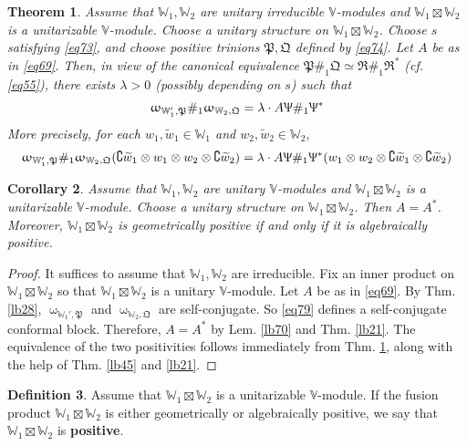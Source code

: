 \documentclass[11pt,b5paper,notitlepage]{article}
\theoremstyle{definition}
\newtheorem{df}{Definition}[section]
\theoremstyle{plain}
\newtheorem{thm}[df]{Theorem}
\newtheorem{co}[df]{Corollary}
\newcommand{\fk}{\mathfrak}
\newcommand{\wtd}{\widetilde}
\newcommand{\Co}{\complement}
\newcommand{\Vbb}{\mathbb V}
\newcommand{\Wbb}{\mathbb W}
\numberwithin{equation}{section}
\begin{document}
\begin{thm}\label{lb50}
Assume that $\Wbb_1,\Wbb_2$ are unitary irreducible $\Vbb$-modules and $\Wbb_1\boxtimes\Wbb_2$ is a unitarizable $\Vbb$-module. Choose a unitary structure on $\Wbb_1\boxtimes\Wbb_2$. Choose $s$ satisfying \eqref{eq73}, and choose positive trinions $\fk P,\fk Q$ defined by \eqref{eq74}. Let $A$ be as in \eqref{eq69}. Then, in view of the canonical equivalence $\fk P\#_1\fk Q\simeq\fk R\#_1\fk R^*$ (cf. \eqref{eq55}), there exists $\lambda>0$ (possibly depending on $s$) such that
\begin{align}
\upomega_{\Wbb_1',\fk P}\#_1\upomega_{\Wbb_2,\fk Q}=\lambda\cdot A\Uppsi\#_1\Uppsi^*  \label{eq76}
\end{align}
More precisely, for each $w_1,\wtd w_1\in\Wbb_1$ and $w_2,\wtd w_2\in\Wbb_2$,
\begin{align}
\upomega_{\Wbb_1',\fk P}\#_1\upomega_{\Wbb_2,\fk Q}(\Co\wtd w_1\otimes w_1\otimes w_2\otimes\Co\wtd w_2)=\lambda\cdot A\Uppsi\#_1\Uppsi^*(w_1\otimes w_2\otimes\Co\wtd w_1\otimes\Co\wtd w_2 )  \label{eq79}
\end{align}
\end{thm}



\begin{co}\label{lb72}
Assume that $\Wbb_1,\Wbb_2$ are unitary $\Vbb$-modules and $\Wbb_1\boxtimes\Wbb_2$ is a unitarizable $\Vbb$-module. Choose a unitary structure on $\Wbb_1\boxtimes\Wbb_2$. Then $A=A^*$. Moreover, $\Wbb_1\boxtimes\Wbb_2$ is geometrically positive if and only if it is algebraically positive. 
\end{co}


\begin{proof}
It suffices to assume that $\Wbb_1,\Wbb_2$ are irreducible. Fix an inner product on $\Wbb_1\boxtimes\Wbb_2$ so that $\Wbb_1\boxtimes\Wbb_2$ is a unitary $\Vbb$-module. Let $A$ be as in \eqref{eq69}. By Thm. \ref{lb28}, $\upomega_{\Wbb_1',\fk P}$ and $\upomega_{\Wbb_2,\fk Q}$ are self-conjugate. So \eqref{eq79} defines a self-conjugate conformal block. Therefore, $A=A^*$ by Lem. \ref{lb70} and Thm. \ref{lb21}. The equivalence of the two positivities follows immediately from Thm. \ref{lb50}, along with the help of Thm. \ref{lb45} and \ref{lb21}. 
\end{proof}







\begin{df}\label{lb59}
Assume that $\Wbb_1\boxtimes\Wbb_2$ is a unitarizable $\Vbb$-module. If the fusion product $\Wbb_1\boxtimes \Wbb_2$ is either geometrically or algebraically positive, we say that $\Wbb_1\boxtimes \Wbb_2$ is \textbf{positive}.
\end{df}
\end{document}
